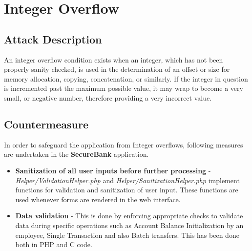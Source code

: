 \section{Integer Overflow}

\subsection{Attack Description}
An integer overflow condition exists when an integer, which has not been properly sanity checked, is used in the determination of an offset or size for memory allocation, copying, concatenation, or similarly. If the integer in question is incremented past the maximum possible value, it may wrap to become a very small, or negative number, therefore providing a very incorrect value.

\subsection{Countermeasure}
In order to safeguard the application from Integer overflows, following measures are undertaken in the \textbf{SecureBank} application.
\begin{itemize}
\item \textbf{Sanitization of all user inputs before further processing} -  \textit{Helper/ValidationHelper.php} and \textit{Helper/SanitizationHelper.php} implement functions for validation and sanitization of user input. These functions are used whenever forms are rendered in the web interface.
\item \textbf{Data validation} - This is done by enforcing appropriate checks to validate data during specific operations such as Account Balance Initialization by an employee, Single Transaction and also Batch transfers. This has been done both in PHP and C code.
\end{itemize}